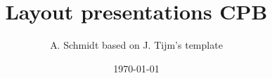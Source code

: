 %
%
%

\documentclass[aspectratio=169,11pt,handout,xcolor=dvipsnames]{beamer}

\usepackage[utf8]{inputenc}
\usepackage[T1]{fontenc}
\usepackage{cpb-beamer} %
\usepackage[dutch,english]{babel}  %
\usepackage{booktabs}
\usepackage{colortbl}
\usepackage{array}
\newcommand{\mypos}[2]{\tikz[remember picture]{\node[inner sep=0pt, anchor=base](#2){#1};}}
\newcommand{\myund}{}
\usepackage{pgfplots}
\pgfplotsset{compat=1.18}
\usepackage{adjustbox}  %
\usepackage{setspace}
\usepackage{soul}
\usepackage{natbib} %
\usepackage{bm}
\usepackage{amsmath,amsfonts,eqnarray}
\usepackage{amssymb,dsfont,bbold}
\usepackage{changepage}
\usepackage{nicefrac}
\usepackage{multirow}
\usepackage{subcaption}


\title[Short title]{Layout presentations CPB}
\author{A. Schmidt based on J. Tijm's template}
\date{\today}


\cpbtitelframe



\begin{frame}{}
\vspace{1cm}
\begin{centering}
    \begin{block}{\centering Task}
    \end{block}
\end{centering}
\pause
\vspace{1cm}
\begin{itemize}
    \item A list:
    \begin{itemize}
        \item Bullet 1
        \pause
        \item Bullet 2
    \end{itemize}
\end{itemize}
\end{frame}

